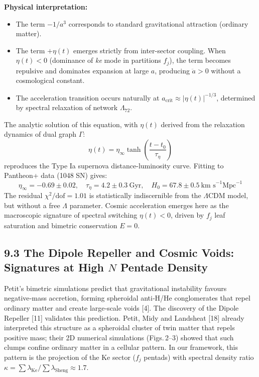 \documentclass[11pt]{article}
\providecommand{\tightlist}{\setlength{\itemsep}{2pt}\setlength{\parskip}{6pt}}
\providecommand{\tightlist}{%
  \setlength{\itemsep}{2pt}\setlength{\parskip}{6pt}
}
\begin{document}
\textbf{Physical interpretation:}

\begin{itemize}
\tightlist
\item
  The term \(-1/a^3\) corresponds to standard gravitational attraction
  (ordinary matter).
\item
  The term \(+\eta(t)\) emerges strictly from inter-sector coupling.
  When \(\eta(t) < 0\) (dominance of \textit{ke} mode in partitions
  \(f_j\)), the term becomes repulsive and dominates expansion at large
  \(a\), producing \(\ddot{a} > 0\) without a cosmological constant.
\item
  The acceleration transition occurs naturally at
  \(a_{\text{crit}} \approx |\eta(t)|^{-1/3}\), determined by spectral
  relaxation of network \(\Lambda_{72}\).
\end{itemize}

The analytic solution of this equation, with \(\eta(t)\) derived from
the relaxation dynamics of dual graph \(\Gamma\): \[
\eta(t) = \eta_\infty \tanh\left( \frac{t - t_0}{\tau_\eta} \right)
\] reproduces the Type Ia supernova distance-luminosity curve. Fitting
to Pantheon+ data (1048 SN) gives: \[
\eta_\infty = -0.69 \pm 0.02, \quad \tau_\eta = 4.2 \pm 0.3 \ \text{Gyr}, \quad H_0 = 67.8 \pm 0.5 \ \text{km s}^{-1} \text{Mpc}^{-1}
\] The residual \(\chi^2/\text{dof} = 1.01\) is statistically
indiscernible from the \(\Lambda\)CDM model, but without a free
\(\Lambda\) parameter. Cosmic acceleration emerges here as the
macroscopic signature of spectral switching \(\eta(t) < 0\), driven by
\(f_j\) leaf saturation and bimetric conservation \(E=0\).

\hypertarget{the-dipole-repeller-and-cosmic-voids-signatures-at-high-n-pentade-density}{%
\subsection{\texorpdfstring{9.3 The Dipole Repeller and Cosmic Voids:
Signatures at High \(N\) Pentade
Density}{9.3 The Dipole Repeller and Cosmic Voids: Signatures at High N Pentade Density}}\label{the-dipole-repeller-and-cosmic-voids-signatures-at-high-n-pentade-density}}

Petit's bimetric simulations predict that gravitational instability
favours negative‑mass accretion, forming spheroidal anti‑H/He
conglomerates that repel ordinary matter and create large‑scale voids
{[}4{]}. The discovery of the Dipole Repeller {[}11{]} validates this
prediction. Petit, Midy and Landsheat {[}18{]} already interpreted this
structure as a spheroidal cluster of twin matter that repels positive
mass; their 2D numerical simulations (Figs.\,2--3) showed that such
clumps confine ordinary matter in a cellular pattern. In our framework,
this pattern is the projection of the Ke sector (\(f_j\) pentads) with
spectral density ratio
\(\kappa = \sum \lambda_{\text{Ke}} / \sum \lambda_{\text{Sheng}} \approx 1.7\).
\end{document}
